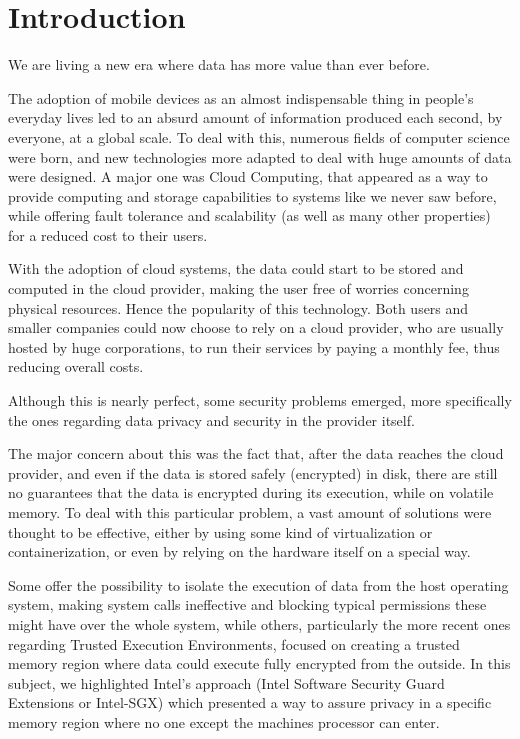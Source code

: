 \newcommand{\novathesis}{\emph{novathesis}}
\newcommand{\novathesisclass}{\texttt{novathesis.cls}}


\chapter{Introduction}
\label{cha:introduction}

We are living a new era where data has more value than ever before. 

The adoption of mobile devices as an almost indispensable thing in people’s everyday lives led to an absurd amount of information produced each second, by everyone, at a global scale. 
To deal with this, numerous fields of computer science were born, and new technologies more adapted to deal with huge amounts of data were designed. 
A major one was Cloud Computing, that appeared as a way to provide computing and storage capabilities to systems like we never saw before, while offering fault tolerance and scalability (as well as many other properties) for a reduced cost to their users. 

With the adoption of cloud systems, the data could start to be stored and computed in the cloud provider, making the user free of worries concerning physical resources. Hence the popularity of this technology. Both users and smaller companies could now choose to rely on a cloud provider, who are usually hosted by huge corporations, to run their services by paying a monthly fee, thus reducing overall costs.

Although this is nearly perfect, some security problems emerged, more specifically the ones regarding data privacy and security in the provider itself. 

The major concern about this was the fact that, after the data reaches the cloud provider, and even if the data is stored safely (encrypted) in disk, there are still no guarantees that the data is encrypted during its execution, while on volatile memory. 
To deal with this particular problem, a vast amount of solutions were thought to be effective, either by using some kind of virtualization or containerization, or even by relying on the hardware itself on a special way. 

Some offer the possibility to isolate the execution of data from the host operating system, making system calls ineffective and blocking typical permissions these might have over the whole system, while others, particularly the more recent ones regarding Trusted Execution Environments, focused on creating a trusted memory region where data could execute fully encrypted from the outside. 
In this subject, we highlighted Intel’s approach (Intel Software Security Guard Extensions or Intel-SGX) which presented a way to assure privacy in a specific memory region where no one except the machines processor can enter. 

